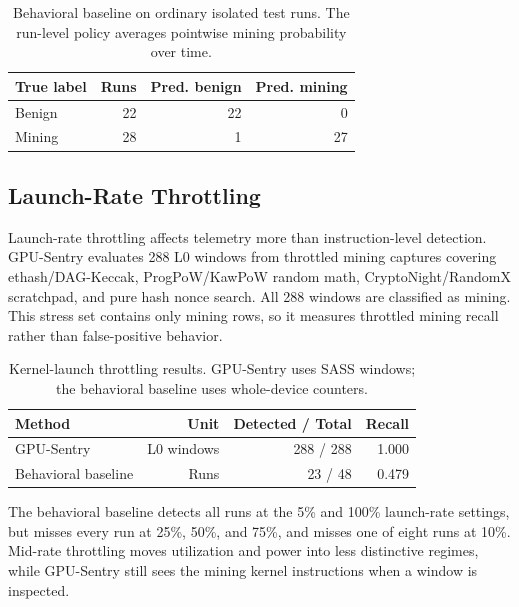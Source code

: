 \begin{table}[t]
    \centering
    \caption{Behavioral baseline on ordinary isolated test runs. The run-level policy averages pointwise mining probability over time.}
    \label{tab:behavior_normal}
    \footnotesize
    \begin{tabular}{lrrr}
        \toprule
        True label & Runs & Pred. benign & Pred. mining \\
        \midrule
        Benign & 22 & 22 & 0 \\
        Mining & 28 & 1 & 27 \\
        \bottomrule
    \end{tabular}
\end{table}

\subsection{Launch-Rate Throttling}

Launch-rate throttling affects telemetry more than instruction-level detection. GPU-Sentry evaluates 288 L0 windows from throttled mining captures covering ethash/DAG-Keccak, ProgPoW/KawPoW random math, CryptoNight/RandomX scratchpad, and pure hash nonce search. All 288 windows are classified as mining. This stress set contains only mining rows, so it measures throttled mining recall rather than false-positive behavior.

\begin{table}[t]
    \centering
    \caption{Kernel-launch throttling results. GPU-Sentry uses SASS windows; the behavioral baseline uses whole-device counters.}
    \label{tab:throttle}
    \footnotesize
    \begin{tabular}{lrrr}
        \toprule
        Method & Unit & Detected / Total & Recall \\
        \midrule
        GPU-Sentry & L0 windows & 288 / 288 & 1.000 \\
        Behavioral baseline & Runs & 23 / 48 & 0.479 \\
        \bottomrule
    \end{tabular}
\end{table}

The behavioral baseline detects all runs at the 5\% and 100\% launch-rate settings, but misses every run at 25\%, 50\%, and 75\%, and misses one of eight runs at 10\%. Mid-rate throttling moves utilization and power into less distinctive regimes, while GPU-Sentry still sees the mining kernel instructions when a window is inspected.

